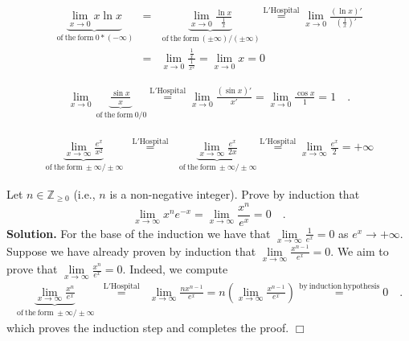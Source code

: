 \documentclass[12pt]{book}
\newenvironment{solution}{\medskip\noindent\textbf{Solution.} }{$\Box$}
\begin{document}
\[\begin{array}{rcl}
\underbrace{\lim\limits_{x\to 0} x\ln x}_{\mathrm{~of~the~form~}0*(-\infty)} &=&\underbrace{\lim\limits_{x\to 0} \frac{\ln x}{\frac{1}{x}}}_{\mathrm{~of~the~form~}(\pm\infty)/(\pm\infty)}\stackrel{\mathrm{L'Hospital}}{=}\lim\limits_{x\to 0} \frac{(\ln x)'}{\left(\frac{1}{x}\right)'}\\&=& \lim\limits_{x\to 0} \frac{\frac{1}{x}}{\frac{1}{x^2}}=  \lim\limits_{x\to 0} x =0
\end{array}
\]

\[
\begin{array}{rcl}
\lim\limits_{x\to 0} \underbrace{\frac{\sin x}x}_{\mathrm{~of~the~form~}0/0}\stackrel{\mathrm{L'Hospital}}{=} \lim\limits_{x\to 0} \frac{(\sin x)'}{x'}= \lim\limits_{x\to 0} \frac{\cos x}{1}= 1\quad .
\end{array}
\]

\[
\begin{array}{rcl}
\underbrace{\lim\limits_{x\to \infty} \frac{e^x}{x^2}}_{\mathrm{~of~the~form~}\pm \infty/\pm\infty} &\stackrel{\mathrm{L'Hospital}}{=} & \underbrace{\lim\limits_{x\to \infty} \frac{e^x}{2x}}_{\mathrm{~of~the~form~}\pm \infty/\pm\infty}\stackrel{\mathrm{L'Hospital}}{=}\lim\limits_{x\to \infty} \frac{e^x}{2}= +\infty
\end{array}
\]

Let $n\in \mathbb Z_{\geq 0}$ (i.e., $n$ is a non-negative integer). Prove by induction that
\begin{equation}\label{eqLimiteMinusXtimesxtoNth}
\lim\limits_{x\to \infty} x^ne^{-x} = \lim\limits_{x\to \infty}\frac{ x^n}{e^{x}}=0\quad .
\end{equation}
\begin{solution}
For the base of the induction we have that $\lim\limits_{x\to \infty}\frac{1}{e^{x}}=0$ as $e^x\to +\infty$. Suppose we have already proven by induction that $ \lim\limits_{x\to \infty}\frac{x^{n-1}}{e^{x}}=0$. We aim to prove that $ \lim\limits_{x\to \infty}\frac{x^{n}}{e^{x}}=0$. Indeed, we compute
\[
\begin{array}{rcl}
\underbrace{\lim\limits_{x\to \infty} \frac{x^n}{e^x}}_{\mathrm{~of~the~form~}\pm \infty/\pm\infty} &\stackrel{\mathrm{L'Hospital}}{=} & \lim\limits_{x\to \infty} \frac{nx^{n-1}}{e^x}=n\left( \lim\limits_{x\to \infty} \frac{x^{n-1}}{e^x}\right) \stackrel{\mathrm{by~induction~hypothesis}}{=}0\quad .
\end{array}
\]
which proves the induction step and completes the proof.
\end{solution}
\end{document}
